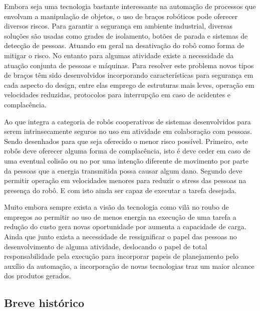 Embora seja uma tecnologia bastante interessante na automação de processos que envolvam a manipulação de objetos, o uso de braços robóticos pode oferecer diversos riscos. Para garantir a segurança em ambiente industrial, diversas soluções são usadas como grades de isolamento, botões de parada e sistemas de detecção de pessoas. Atuando em geral na desativação do robô como forma de mitigar o risco. No entanto para algumas atividade existe a necessidade da atuação conjunta de pessoas e máquinas. Para resolver este problema novos tipos de braços têm sido desenvolvidos incorporando características para segurança em cada aspecto do design, entre elas emprego de estruturas mais leves, operação em velocidades reduzidas, protocolos para interrupção em caso de acidentes e complacência. \cite{nobody}

Ao que integra a categoria de robôs cooperativos de sistemas desenvolvidos para serem intrinsecamente seguros no uso em atividade em colaboração com pessoas. Sendo desenhados para que seja oferecido o menor risco possível. Primeiro, este robôs deve oferecer alguma forma de complacência, isto é deve ceder em caso de uma eventual colisão ou no por uma intenção diferente de movimento por parte da pessoas que a energia transmitida possa causar algum dano. Segundo deve permitir operação em velocidades menores para reduzir o stress das pessoas na presença do robô. E com isto ainda ser capaz de executar a tarefa desejada.

Muito embora sempre exista a visão da tecnologia como vilã no roubo de empregos ao permitir ao uso de menos energia na execução de uma tarefa a redução do custo gera novas oportunidade por aumenta a capacidade de carga. Ainda que junto exista a necessidade de ressignificar o papel das pessoas no desenvolvimento de alguma atividade, deslocando o papel de total responsabilidade pela execução para incorporar papeis de planejamento pelo auxílio da automação, a incorporação de novas tecnologias traz um maior alcance dos produtos gerados.


\subsection{Breve histórico}

